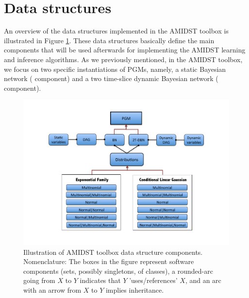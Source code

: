 \section{Data structures} \label{sec:DataStructures}

An overview of the data structures implemented in the AMIDST toolbox is illustrated in Figure \ref{Figure:ToolboxDataStructures}. These data structures basically define the main components that will be used afterwards for implementing the AMIDST learning and inference algorithms. As we previously mentioned, in the AMIDST toolbox, we focus on two specific instantiations of PGMs, namely, a static Bayesian network ( component) and a two time-slice dynamic Bayesian network ( component). 

\vspace{-0.1in}

\begin{figure}[ht!]
\begin{center}
\includegraphics[width=\linewidth]{./figures/DataStructure}
\vspace{-0.5in}
\caption{\label{Figure:ToolboxDataStructures} Illustration of AMIDST toolbox data structure components. Nomenclature: The boxes in the
      figure represent software components (sets, possibly singletons, of classes), a rounded-arc going from $X$ to $Y$ indicates that $Y$ 'uses/references' $X$, and an arc with an arrow from $X$ to $Y$ implies inheritance.}
\end{center}
\end{figure}

